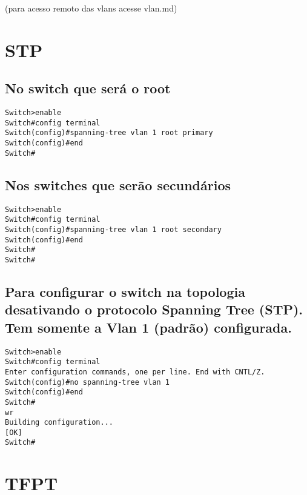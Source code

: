 \documentclass[]{article}
\begin{document}
(para acesso remoto das vlans acesse vlan.md)

\hypertarget{stp}{%
\section{STP}\label{stp}}

\hypertarget{no-switch-que-seruxe1-o-root}{%
\subsection{No switch que será o
root}\label{no-switch-que-seruxe1-o-root}}

\begin{verbatim}
Switch>enable
Switch#config terminal
Switch(config)#spanning-tree vlan 1 root primary
Switch(config)#end
Switch#
\end{verbatim}

\hypertarget{nos-switches-que-seruxe3o-secunduxe1rios}{%
\subsection{Nos switches que serão
secundários}\label{nos-switches-que-seruxe3o-secunduxe1rios}}

\begin{verbatim}
Switch>enable
Switch#config terminal
Switch(config)#spanning-tree vlan 1 root secondary
Switch(config)#end
Switch#
Switch#
\end{verbatim}

\hypertarget{para-configurar-o-switch-na-topologia-desativando-o-protocolo-spanning-tree-stp.-tem-somente-a-vlan-1-padruxe3o-configurada.}{%
\subsection{Para configurar o switch na topologia desativando o
protocolo Spanning Tree (STP). Tem somente a Vlan 1 (padrão)
configurada.}\label{para-configurar-o-switch-na-topologia-desativando-o-protocolo-spanning-tree-stp.-tem-somente-a-vlan-1-padruxe3o-configurada.}}

\begin{verbatim}
Switch>enable
Switch#config terminal
Enter configuration commands, one per line. End with CNTL/Z.
Switch(config)#no spanning-tree vlan 1
Switch(config)#end
Switch#
wr
Building configuration...
[OK]
Switch#
\end{verbatim}

\hypertarget{tfpt}{%
\section{TFPT}\label{tfpt}}
\end{document}
